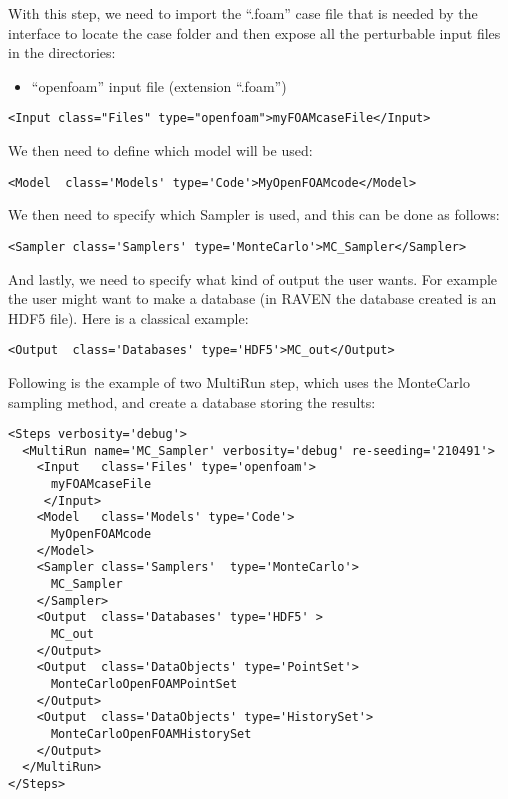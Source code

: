 With this step, we need to import the ``.foam'' case file that is needed by the interface to locate the case folder and then expose all the perturbable input files in the  directories:
\begin{itemize}
  \item ``openfoam'' input file (extension ``.foam'')
\end{itemize}
\begin{lstlisting}[style=XML,morekeywords={name,class,type}]
    <Input class="Files" type="openfoam">myFOAMcaseFile</Input>
\end{lstlisting}

We then need to define which model will be used:
\begin{lstlisting}[style=XML]
    <Model  class='Models' type='Code'>MyOpenFOAMcode</Model>
\end{lstlisting}
We then need to specify which Sampler is used, and this can be done as follows:
\begin{lstlisting}[style=XML]
    <Sampler class='Samplers' type='MonteCarlo'>MC_Sampler</Sampler>
\end{lstlisting}
And lastly, we need to specify what kind of output the user wants.
%
For example the user might want to make a database (in RAVEN the database
created is an HDF5 file).
%
Here is a classical example:
\begin{lstlisting}[style=XML,morekeywords={class,type}]
    <Output  class='Databases' type='HDF5'>MC_out</Output>
\end{lstlisting}

Following is the example of two MultiRun step, which uses the MonteCarlo sampling
method, and create a database storing the results:
\begin{lstlisting}[style=XML]
<Steps verbosity='debug'>
  <MultiRun name='MC_Sampler' verbosity='debug' re-seeding='210491'>
    <Input   class='Files' type='openfoam'>
      myFOAMcaseFile
     </Input>
    <Model   class='Models' type='Code'>
      MyOpenFOAMcode
    </Model>
    <Sampler class='Samplers'  type='MonteCarlo'>
      MC_Sampler
    </Sampler>
    <Output  class='Databases' type='HDF5' >
      MC_out
    </Output>
    <Output  class='DataObjects' type='PointSet'>
      MonteCarloOpenFOAMPointSet
    </Output>
    <Output  class='DataObjects' type='HistorySet'>
      MonteCarloOpenFOAMHistorySet
    </Output>
  </MultiRun>
</Steps>
\end{lstlisting}

